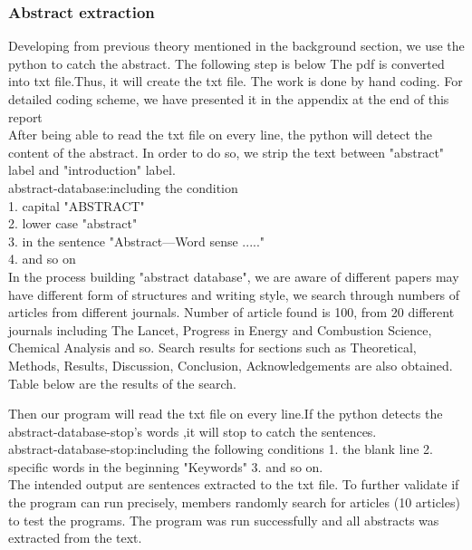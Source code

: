 \subsubsection*{Abstract extraction}
	Developing from previous theory mentioned in the background section, we use the python to catch the abstract. The following step is below
	The pdf is converted into txt file.Thus, it will create the txt file. The work is done by hand coding. For detailed coding scheme, we have presented it in the appendix at the end of this report\\ 
	After being able to read the txt file on every line, the python will detect the content of the abstract. In order to do so, we strip the text between "abstract" label and "introduction" label.\\ 	
	abstract-database:including the condition\\
	1. capital         "ABSTRACT"\\
	2. lower case      "abstract"\\
	3. in the sentence "Abstract—Word sense ....."\\
	4. and so on \\
	In the process building "abstract database", we are aware of different papers may have different form of structures and writing style, we search through numbers of articles from different journals. Number of article found is 100, from 20 different journals including The Lancet, Progress in Energy and Combustion Science, Chemical Analysis and so. Search results for sections such as Theoretical, Methods, Results, Discussion, Conclusion, Acknowledgements are also obtained.  Table below are the results of the search.\\
	\begin{center}
	\end{center}
	Then our program will read the txt file on every line.If the python detects the abstract-database-stop's words ,it will stop to catch the sentences.\\ 
	abstract-database-stop:including the following conditions
	1. the blank line
	2. specific words in the beginning "Keywords"
	3. and so on.\\
	The intended output are sentences extracted to the txt file. To further validate if the program can run precisely, members randomly search for articles (10 articles) to test the programs. The program was run successfully and all abstracts was extracted from the text. \\ 	
	

